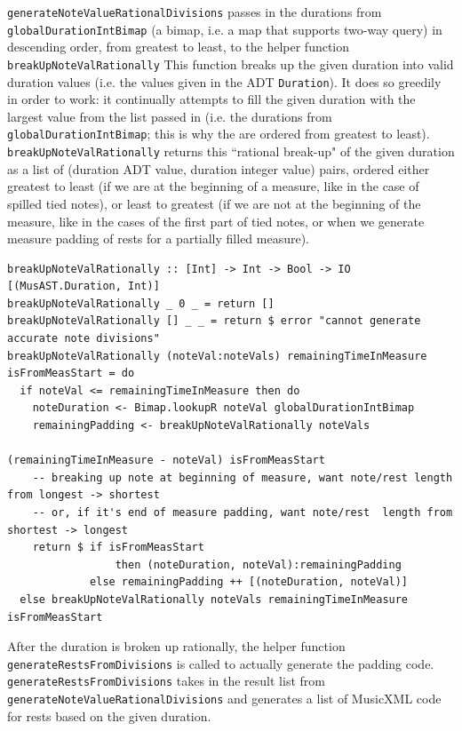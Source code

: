 \documentclass{report}
\begin{document}
\verb.generateNoteValueRationalDivisions.  passes in the durations from \verb.globalDurationIntBimap. (a bimap, i.e. a map that supports two-way query) in descending order, from greatest to least, to the helper function \verb.breakUpNoteValRationally. This function breaks up the given duration into valid duration values (i.e. the values given in the ADT \verb.Duration.). It does so greedily in order to work: it continually attempts to fill the given duration with the largest value from the list passed in (i.e. the durations from \verb.globalDurationIntBimap.; this is why the are ordered from greatest to least). \verb.breakUpNoteValRationally. returns this ``rational break-up" of the given duration as a list of (duration ADT value, duration integer value) pairs, ordered either greatest to least (if we are at the beginning of a measure, like in the case of spilled  tied notes), or least to greatest (if we are not at the beginning of the measure, like in the cases of the first part of tied notes, or when we generate measure padding of rests for a partially filled measure). 
\begin{verbatim}
breakUpNoteValRationally :: [Int] -> Int -> Bool -> IO [(MusAST.Duration, Int)]
breakUpNoteValRationally _ 0 _ = return []
breakUpNoteValRationally [] _ _ = return $ error "cannot generate accurate note divisions" 
breakUpNoteValRationally (noteVal:noteVals) remainingTimeInMeasure isFromMeasStart = do
  if noteVal <= remainingTimeInMeasure then do
    noteDuration <- Bimap.lookupR noteVal globalDurationIntBimap 
    remainingPadding <- breakUpNoteValRationally noteVals 
                                                (remainingTimeInMeasure - noteVal) isFromMeasStart
    -- breaking up note at beginning of measure, want note/rest length from longest -> shortest
    -- or, if it's end of measure padding, want note/rest  length from shortest -> longest
    return $ if isFromMeasStart 
                 then (noteDuration, noteVal):remainingPadding 
             else remainingPadding ++ [(noteDuration, noteVal)]
  else breakUpNoteValRationally noteVals remainingTimeInMeasure isFromMeasStart
\end{verbatim}
After the duration is broken up rationally, the helper function \verb.generateRestsFromDivisions. is called to actually generate the padding code. \verb.generateRestsFromDivisions. takes in the result list from  \verb.generateNoteValueRationalDivisions. and generates a list of MusicXML code for rests based on the given duration.
\end{document}
